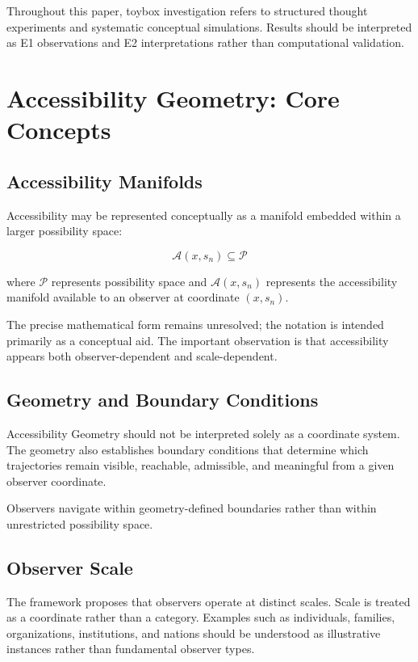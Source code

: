 \documentclass[12pt]{article}
\theoremstyle{plain}
\theoremstyle{definition}
\theoremstyle{remark}
\begin{document}
Throughout this paper, toybox investigation refers to structured thought experiments and systematic conceptual simulations. Results should be interpreted as E1 observations and E2 interpretations rather than computational validation.

\section{Accessibility Geometry: Core Concepts}

\subsection{Accessibility Manifolds}

Accessibility may be represented conceptually as a manifold embedded within a larger possibility space:

\[
\mathcal{A}(x,s_n) \subseteq \mathcal{P}
\]

where $\mathcal{P}$ represents possibility space and $\mathcal{A}(x,s_n)$ represents the accessibility manifold available to an observer at coordinate $(x,s_n)$.

The precise mathematical form remains unresolved; the notation is intended primarily as a conceptual aid. The important observation is that accessibility appears both observer-dependent and scale-dependent.

\subsection{Geometry and Boundary Conditions}

Accessibility Geometry should not be interpreted solely as a coordinate system. The geometry also establishes boundary conditions that determine which trajectories remain visible, reachable, admissible, and meaningful from a given observer coordinate.

Observers navigate within geometry-defined boundaries rather than within unrestricted possibility space.

\subsection{Observer Scale}

The framework proposes that observers operate at distinct scales. Scale is treated as a coordinate rather than a category. Examples such as individuals, families, organizations, institutions, and nations should be understood as illustrative instances rather than fundamental observer types.
\end{document}
